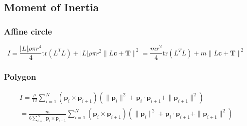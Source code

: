\documentclass[10pt]{report}
\begin{document}
\subsection{Moment of Inertia}

\subsubsection{Affine circle}
\begin{equation}I=\frac{|L|\rho\pi r^4}{4}\mbox{tr}(L^TL)+|L|\rho\pi r^2\|L\boldsymbol{c}+\boldsymbol{T}\|^2=\frac{mr^2}{4}\mbox{tr}(L^TL)+m\|L\boldsymbol{c}+\boldsymbol{T}\|^2\end{equation}

\subsubsection{Polygon}
\begin{multline}I=\frac{\rho}{12}\sum_{i=1}^N(\boldsymbol{p}_i\times\boldsymbol{p}_{i+1})(\|\boldsymbol{p}_i\|^2+\boldsymbol{p}_i\cdot\boldsymbol{p}_{i+1}+\|\boldsymbol{p}_{i+1}\|^2)\\=\frac{m}{6\sum_{i=1}^N\boldsymbol{p}_i\times\boldsymbol{p}_{i+1}}\sum_{i=1}^N(\boldsymbol{p}_i\times\boldsymbol{p}_{i+1})(\|\boldsymbol{p}_i\|^2+\boldsymbol{p}_i\cdot\boldsymbol{p}_{i+1}+\|\boldsymbol{p}_{i+1}\|^2)\end{multline}
\end{document}
